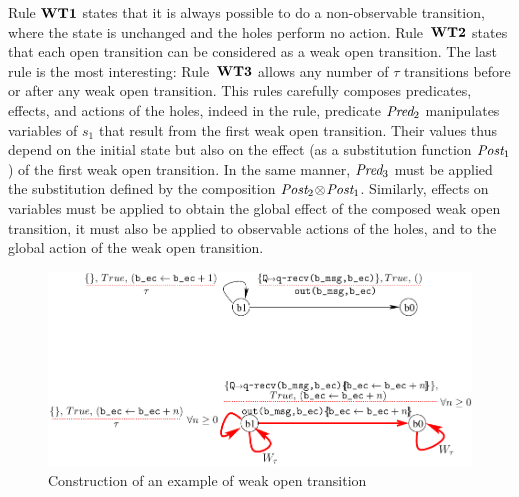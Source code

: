 \documentclass{lmcs}
\newcommand{\shortotimes}{\!\otimes\!}
\begin{document}
Rule $\textbf{WT1}$ states that it is always possible to do a non-observable transition, where the state is unchanged and the holes perform no action. Rule~$\textbf{WT2}$ states that each open transition can be considered as a weak open transition. The last rule is the most interesting:  Rule~$\textbf{WT3}$ allows any number of $\tau$ transitions before or after any weak open transition. This rules carefully composes predicates, effects, and actions of the holes, indeed in the rule, predicate $\Pred_2$ manipulates variables of $s_1$ that result from the first weak open transition. Their values thus depend on the initial state but also on the effect (as a substitution function $\Post_1$) of the first weak open transition. In the same manner, $\Pred_3$ must be applied the substitution defined by the composition $\Post_2\shortotimes\Post_1$. Similarly, effects on variables must be applied to obtain the global effect of the composed weak open transition, it must also be applied to observable actions of the holes, and to the global action of the weak open transition.



\begin{figure}[ht]
   \centerline{\includegraphics[width=13cm]{XFIG/WOT2-result}}
  \caption{Construction of an example of weak open transition}
   \label{WOT2}
\end{figure}
\end{document}
